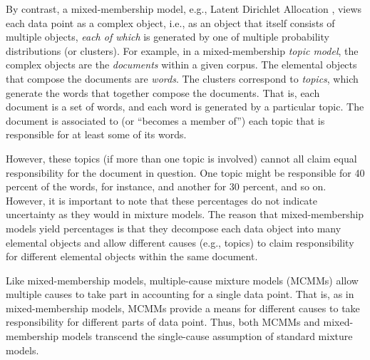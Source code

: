 By contrast, a mixed-membership model, e.g., Latent Dirichlet Allocation \citep{blei-et-al:2003},
views each data point as a complex object, i.e., as an object that itself consists of multiple objects, 
\emph{each of which} is generated by one of multiple probability distributions (or clusters). 
For example, in a mixed-membership \textit{topic model}, the complex objects are the 
\emph{documents} within a given corpus. The elemental objects that compose 
the documents are \emph{words}. The clusters correspond to \emph{topics}, which generate 
the words that together compose the documents. That is, each document is a set of words, and each 
word is generated by a particular topic. The document is associated to 
(or ``becomes a member of'') each topic that is
responsible for at least some of its words. 

However, these topics (if more than one topic is involved) cannot all claim equal responsibility
for the document in question. One topic might be responsible for 40 percent of the words, for instance, 
and another for 30 percent, and so on. 
However, it is important to note that these percentages 
do not indicate uncertainty as they would in mixture models. 
The reason that mixed-membership models yield percentages is 
that they decompose each data object into many elemental objects and allow different 
causes (e.g., topics) to claim responsibility for different 
elemental objects within the same document. 

Like mixed-membership models, multiple-cause mixture models (MCMMs) 
allow multiple causes to take part in accounting for a single data point. 
That is, as in mixed-membership models, MCMMs provide a means for 
different causes to take responsibility for different parts of data point. 
Thus, both MCMMs and mixed-membership models transcend the single-cause assumption of standard 
mixture models.

